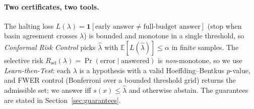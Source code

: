 \paragraph{Two certificates, two tools.} The halting loss $L(\lambda) = \mathbf 1[\text{early answer}
\ne \text{full-budget answer}]$ (stop when basin agreement crosses $\lambda$) is bounded and monotone
in a single threshold, so \emph{Conformal Risk Control} picks $\hat\lambda$ with
$\mathbb E[L(\hat\lambda)] \le \alpha$ in finite samples. The selective risk
$R_{\mathrm{sel}}(\lambda) = \Pr(\text{error}\mid\text{answered})$ is \emph{non}-monotone, so we use
\emph{Learn-then-Test}: each $\lambda$ is a hypothesis with a valid Hoeffding--Bentkus $p$-value, and
FWER control (Bonferroni over a bounded threshold grid) returns the admissible set; we answer iff
$s(x)\le\hat\lambda$ and otherwise abstain. The guarantees are stated in
Section~\ref{sec:guarantees}.
